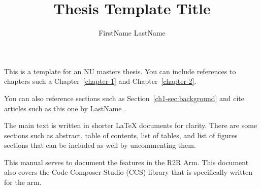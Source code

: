 \documentclass[letterpaper,12pt]{nuthesis}	%
\author{FirstName LastName}
\title{Thesis Template Title}
\begin{document}
%	
%


\frontmatter		%
\maketitle		%

\preface		

	This is a template for an NU masters thesis. You can include references to chapters such a Chapter~\ref{chapter-1} and Chapter~\ref{chapter-2}.
	
	You can also reference sections such as Section~\ref{ch1-sec:background} and cite articles such as this one by LastName \cite{LastName2017}.
	
	The main text is written in shorter LaTeX documents for clarity. There are some sections such as abstract, table of contents, list of tables, and list of figures sections that can be included as well by uncommenting them. 
	


\clearpage{} %
\tableofcontents	%



\mainmatter             %

\singlespacing 

This manual serves to document the features in the R2R Arm. This document also covers the Code Composer Studio (CCS) library that is specifically written for the arm.
\end{document}
